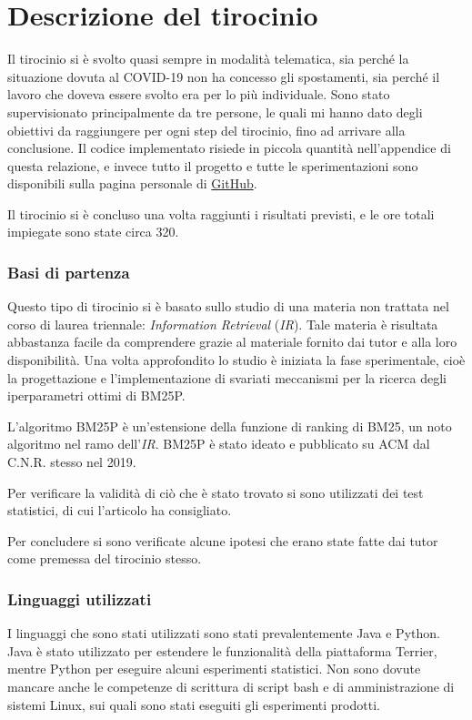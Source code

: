 \chapter{Descrizione del tirocinio}

Il tirocinio si è svolto quasi sempre in modalità telematica,
sia perché la situazione dovuta al COVID-19 non ha concesso
gli spostamenti, sia perché  il lavoro che doveva essere svolto
era per lo più individuale.
Sono stato supervisionato principalmente da tre persone,
le quali mi hanno dato degli obiettivi da raggiungere per ogni
step del tirocinio,
fino ad arrivare alla conclusione.
Il codice implementato risiede in piccola
quantità nell'appendice di questa relazione,
e invece tutto il progetto e tutte le sperimentazioni
sono disponibili sulla pagina personale di \href{https://github.com/federicosilvestri/bm25p-thesis}{GitHub}.

Il tirocinio si è concluso una volta raggiunti i risultati
previsti, e le ore totali impiegate sono state circa 320.

\subsection{Basi di partenza}
Questo tipo di tirocinio si è basato
sullo studio di una materia non trattata nel corso di laurea triennale:
\textit{Information Retrieval} (\textit{IR}).
Tale materia è risultata abbastanza facile da comprendere grazie
al materiale fornito dai tutor e alla loro disponibilità.
Una volta approfondito lo studio è iniziata la fase sperimentale,
cioè la progettazione e l'implementazione di svariati meccanismi per la ricerca 
degli iperparametri ottimi di BM25P.

L'algoritmo BM25P è un'estensione della funzione di ranking
di BM25, un noto algoritmo nel ramo dell'\textit{IR}.
BM25P è stato ideato e pubblicato su ACM dal C.N.R.
stesso nel 2019.\cite{10.1145/3331184.3331373}

Per verificare la validità di ciò che è stato trovato
si sono utilizzati dei test statistici, di cui l'articolo\cite{10.1145/1321440.1321528}
ha consigliato.

Per concludere si sono verificate alcune ipotesi
che erano state fatte dai tutor come premessa
del tirocinio stesso.

\subsection{Linguaggi utilizzati}
I linguaggi che sono stati utilizzati sono stati prevalentemente Java e Python.
Java è stato utilizzato per estendere le funzionalità della piattaforma Terrier,
mentre Python per eseguire alcuni esperimenti statistici.
Non sono dovute mancare anche le competenze di scrittura di script
bash e di amministrazione di sistemi Linux, sui quali sono stati
eseguiti gli esperimenti prodotti.

